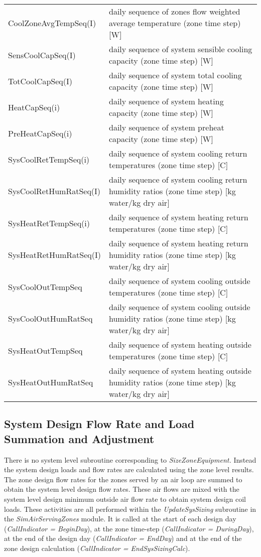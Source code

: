 \begin{longtable}[c]{p{2.0in}p{4.0in}}
CoolZoneAvgTempSeq(I) & daily sequence of zones flow weighted average temperature (zone time step) [W] \tabularnewline
SensCoolCapSeq(I) & daily sequence of system sensible cooling capacity (zone time step) [W] \tabularnewline
TotCoolCapSeq(I) & daily sequence of system total cooling capacity (zone time step) [W] \tabularnewline
HeatCapSeq(i) & daily sequence of system heating capacity (zone time step) [W] \tabularnewline
PreHeatCapSeq(i) & daily sequence of system preheat capacity (zone time step) [W] \tabularnewline
SysCoolRetTempSeq(i) & daily sequence of system cooling return temperatures (zone time step) [C] \tabularnewline
SysCoolRetHumRatSeq(I) & daily sequence of system cooling return humidity ratios (zone time step) [kg water/kg dry air] \tabularnewline
SysHeatRetTempSeq(i) & daily sequence of system heating return temperatures (zone time step) [C] \tabularnewline
SysHeatRetHumRatSeq(I) & daily sequence of system heating return humidity ratios (zone time step) [kg water/kg dry air] \tabularnewline
SysCoolOutTempSeq & daily sequence of system cooling outside temperatures (zone time step) [C] \tabularnewline
SysCoolOutHumRatSeq & daily sequence of system cooling outside humidity ratios (zone time step) [kg water/kg dry air] \tabularnewline
SysHeatOutTempSeq & daily sequence of system heating outside temperatures (zone time step) [C] \tabularnewline
SysHeatOutHumRatSeq & daily sequence of system heating outside humidity ratios (zone time step) [kg water/kg dry air] \tabularnewline
\bottomrule
\end{longtable}

\subsection{System Design Flow Rate and Load Summation and Adjustment}\label{system-design-flow-rate-and-load-summation-and-adjustment}

There is no system level subroutine corresponding to \emph{SizeZoneEquipment.} Instead the system design loads and flow rates are calculated using the zone level results. The zone design flow rates for the zones served by an air loop are summed to obtain the system level design flow rates. These air flows are mixed with the system level design minimum outside air flow rate to obtain system design coil loads. These activities are all performed within the \emph{UpdateSysSizing} subroutine in the \emph{SimAirServingZones} module. It is called at the start of each design day (\emph{CallIndicator = BeginDay}), at the zone time-step (\emph{CallIndicator = DuringDay}), at the end of the design day (\emph{CallIndicator = EndDay}) and at the end of the zone design calculation (\emph{CallIndicator = EndSysSizingCalc}).

